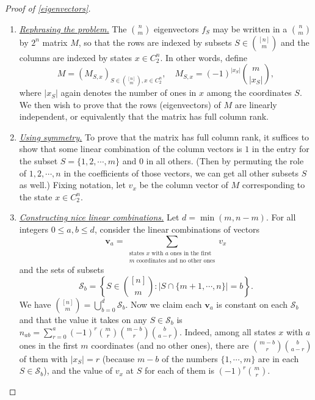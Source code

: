 \documentclass[11pt]{article}
\newcommand{\mc}{\mathcal}
\newcounter{r}
\newcounter{s}
\numberwithin{equation}{section}
\begin{document}
\begin{proof}[Proof of \cref{eigenvectors}]
\begin{enumerate}
    \item \textit{\underline{Rephrasing the problem.}} The $\binom{n}{m}$ eigenvectors $f_S$ may be written in a $\binom{n}{m}$ by $2^n$ matrix $M$, so that the rows are indexed by subsets $S \in \binom{[n]}{m}$ and the columns are indexed by states $x \in C_2^n$. In other words, define
    \[
        M = (M_{S, x})_{S \in \binom{[n]}{m}, x \in C_2^n}, \quad M_{S, x} = (-1)^{|x_S|} \binom{m}{|x_S|}, 
    \]
    where $|x_S|$ again denotes the number of ones in $x$ among the coordinates $S$. We then wish to prove that the rows (eigenvectors) of $M$ are linearly independent, or equivalently that the matrix has full column rank. 
    \item \textit{\underline{Using symmetry.}} To prove that the matrix has full column rank, it suffices to show that some linear combination of the column vectors is $1$ in the entry for the subset $S = \{1, 2, \cdots, m\}$ and $0$ in all others. (Then by permuting the role of $1, 2, \cdots, n$ in the coefficients of those vectors, we can get all other subsets $S$ as well.) Fixing notation, let $v_x$ be the column vector of $M$ corresponding to the state $x \in C_2^n$.
    \item \textit{\underline{Constructing nice linear combinations.}} Let $d = \min(m, n-m)$. For all integers $0 \le a, b \le d$, consider the linear combinations of vectors
    \[
        \mathbf{v}_a = \sum_{\substack{\text{states }x \text{ with }a \text{ ones in the first } \\m \text{ coordinates and no other ones}}} v_x
    \]
    and the sets of subsets
    \[
        \mc{S}_b = \left\{S \in \binom{[n]}{m}: \Big|S \cap \{m+1, \cdots, n\}\Big|  = b\right\}.
    \]
    We have $\binom{[n]}{m} = \bigcup_{b=0}^d \mc{S}_b$. Now we claim each $\mathbf{v}_a$ is constant on each $\mc{S}_b$ and that the value it takes on any $S \in \mc{S}_b$ is $n_{ab} = \sum_{r = 0}^a (-1)^r \binom{m}{r} \binom{m-b}{r} \binom{b}{a-r}$. Indeed, among all states $x$ with $a$ ones in the first $m$ coordinates (and no other ones), there are $\binom{m-b}{r} \binom{b}{a-r}$ of them with $|x_S| = r$ (because $m-b$ of the numbers $\{1, \cdots, m\}$ are in each $S \in \mc{S}_b$), and the value of $v_x$ at $S$ for each of them is $(-1)^r \binom{m}{r}$. 


\end{enumerate}
\end{proof}
\end{document}
